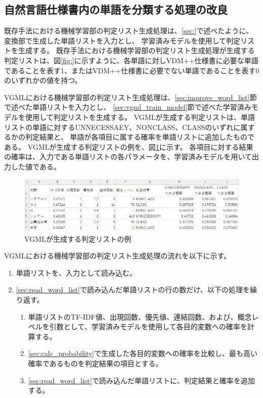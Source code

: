 \subsection{自然言語仕様書内の単語を分類する処理の改良}
既存手法における機械学習部の判定リスト生成処理は、\ref{sec:}で述べたように、変換部で生成した単語リストを入力とし、
学習済みモデルを使用して判定リストを生成する。
既存手法における機械学習部の判定リスト生成処理が生成する判定リストは、図\ref{fig:}に示すように、各単語に対しVDM++仕様書に必要な単語であることを表す1、またはVDM++仕様書に必要でない単語であることを表す0のいずれかの値を持つ。

VGMLにおける機械学習部の判定リスト生成処理は、\ref{sec:improve_word_list}節で述べた単語リストを入力とし、
\ref{sec:vgml_train_model}節で述べた学習済みモデルを使用して判定リストを生成する。
VGMLが生成する判定リストは、単語リストの単語に対するUNNECESSAEY、NONCLASS、CLASSのいずれに属するかの判定結果と、
単語が各項目に属する確率を単語リストに追加したものである。
VGMLが生成する判定リストの例を、図\ref{fig:vgml_judge_list}に示す。
各項目に対する結果の確率は、入力である単語リストの各パラメータを、学習済みモデルを用いて出力した値である。

\begin{figure}[t]
    \begin{center}
        \includegraphics[width=1.0\columnwidth]{image/vgml_judge_list.png}
        \caption{VGMLが生成する判定リストの例}
        \label{fig:vgml_judge_list}
    \end{center}
\end{figure}

VGMLにおける機械学習部の判定リスト生成処理の流れを以下に示す。

\begin{enumerate}
    \item 単語リストを、入力として読み込む。
    \label{sec:read_word_list}
    \item \ref{sec:read_word_list}で読み込んだ単語リストの行の数だけ、以下の処理を繰り返す。
        \begin{enumerate}
            \item 単語リストのTF-IDF値、出現回数、優先値、連結回数、および、概念レベルを引数として、学習済みモデルを使用して各目的変数への確率を計算する。
            \label{sec:calc_probability}
            \item \ref{sec:calc_probability}で生成した各目的変数への確率を比較し、最も高い確率であるものを判定結果の項目とする。
            \item \ref{sec:read_word_list}で読み込んだ単語リストに、判定結果と確率を追加する。
        \end{enumerate}
\end{enumerate}


